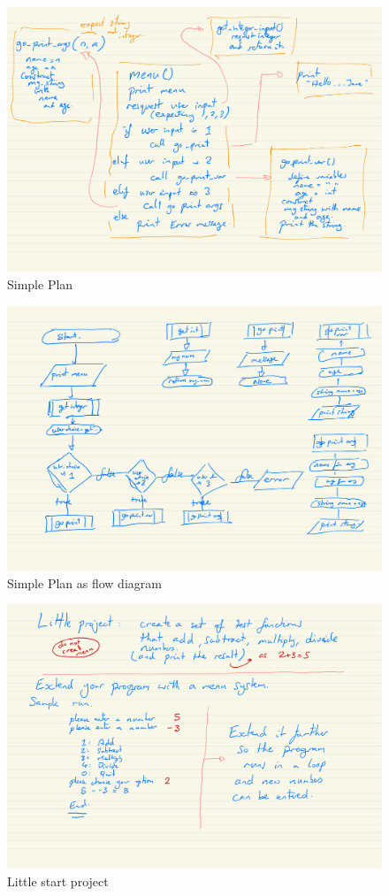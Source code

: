 \documentclass[a4paper,12pt]{article}
\begin{document}
\begin{figure}[!ht]
	\centering
	\includegraphics[width=15cm]{function_plan_1.pdf}
	\caption*{Simple Plan}
\end{figure}

\begin{figure}[!ht]
	\centering
	\includegraphics[width=15cm]{function_plan_2_flow_diagram.pdf}
	\caption*{Simple Plan as flow diagram}
\end{figure}

\newpage
\begin{figure}[!ht]
	\centering
	\includegraphics[width=15cm]{little_start_project.pdf}
	\caption*{Little start project}
\end{figure}
\end{document}
